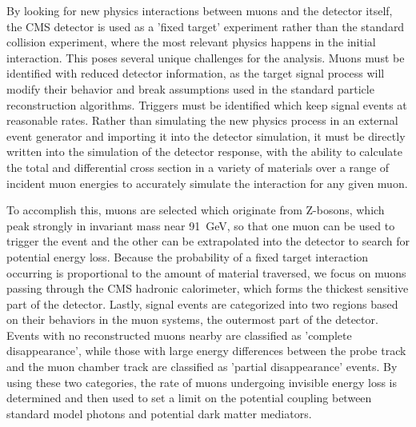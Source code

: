 By looking for new physics interactions between muons and the detector itself, the CMS detector is used as a 'fixed target' experiment rather than the standard collision experiment, where the most relevant physics happens in the initial interaction.
This poses several unique challenges for the analysis.
Muons must be identified with reduced detector information, as the target signal process will modify their behavior and break assumptions used in the standard particle reconstruction algorithms.
Triggers must be identified which keep signal events at reasonable rates.
Rather than simulating the new physics process in an external event generator and importing it into the detector simulation, it must be directly written into the simulation of the detector response, with the ability to calculate the total and differential cross section in a variety of materials over a range of incident muon energies to accurately simulate the interaction for any given muon.

To accomplish this, muons are selected which originate from Z-bosons, which peak strongly in invariant mass near \SI{91}{\giga\eV}, so that one muon can be used to trigger the event and the other can be extrapolated into the detector to search for potential energy loss.
Because the probability of a fixed target interaction occurring is proportional to the amount of material traversed, we focus on muons passing through the CMS hadronic calorimeter, which forms the thickest sensitive part of the detector.
Lastly, signal events are categorized into two regions based on their behaviors in the muon systems, the outermost part of the detector. 
Events with no reconstructed muons nearby are classified as 'complete disappearance', while those with large energy differences between the probe track and the muon chamber track are classified as 'partial disappearance' events.
By using these two categories, the rate of muons undergoing invisible energy loss is determined and then used to set a limit on the potential coupling between standard model photons and potential dark matter mediators.

